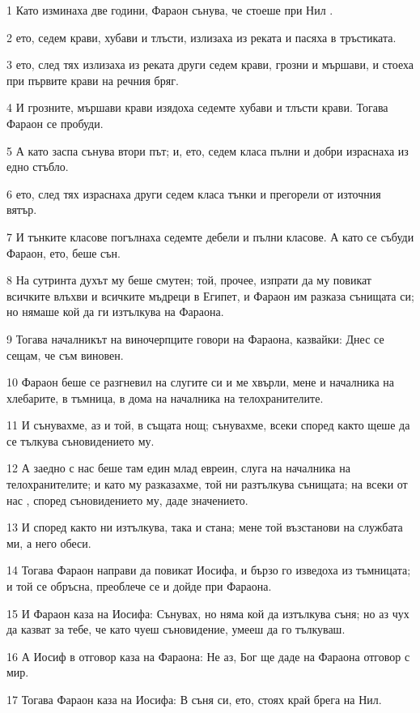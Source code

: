 \par 1 Като изминаха две години, Фараон сънува, че стоеше при Нил .
\par 2 ето, седем крави, хубави и тлъсти, излизаха из реката и пасяха в тръстиката.
\par 3 ето, след тях излизаха из реката други седем крави, грозни и мършави, и стоеха при първите крави на речния бряг.
\par 4 И грозните, мършави крави изядоха седемте хубави и тлъсти крави. Тогава Фараон се пробуди.
\par 5 А като заспа сънува втори път; и, ето, седем класа пълни и добри израснаха из едно стъбло.
\par 6 ето, след тях израснаха други седем класа тънки и прегорели от източния вятър.
\par 7 И тънките класове погълнаха седемте дебели и пълни класове. А като се събуди Фараон, ето, беше сън.
\par 8 На сутринта духът му беше смутен; той, прочее, изпрати да му повикат всичките влъхви и всичките мъдреци в Египет, и Фараон им разказа сънищата си; но нямаше кой да ги изтълкува на Фараона.
\par 9 Тогава началникът на виночерпците говори на Фараона, казвайки: Днес се сещам, че съм виновен.
\par 10 Фараон беше се разгневил на слугите си и ме хвърли, мене и началника на хлебарите, в тъмница, в дома на началника на телохранителите.
\par 11 И сънувахме, аз и той, в същата нощ; сънувахме, всеки според както щеше да се тълкува съновидението му.
\par 12 А заедно с нас беше там един млад евреин, слуга на началника на телохранителите; и като му разказахме, той ни разтълкува сънищата; на всеки от нас , според съновидението му, даде значението.
\par 13 И според както ни изтълкува, така и стана; мене той възстанови на службата ми, а него обеси.
\par 14 Тогава Фараон направи да повикат Иосифа, и бързо го изведоха из тъмницата; и той се обръсна, преоблече се и дойде при Фараона.
\par 15 И Фараон каза на Иосифа: Сънувах, но няма кой да изтълкува съня; но аз чух да казват за тебе, че като чуеш съновидение, умееш да го тълкуваш.
\par 16 А Иосиф в отговор каза на Фараона: Не аз, Бог ще даде на Фараона отговор с мир.
\par 17 Тогава Фараон каза на Иосифа: В съня си, ето, стоях край брега на Нил.
